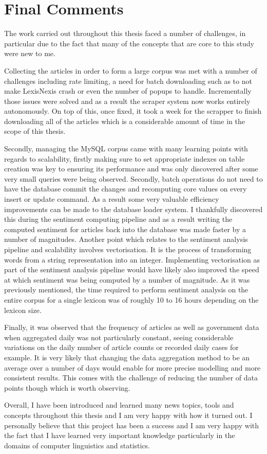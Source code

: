 \section{Final Comments}

The work carried out throughout this thesis faced a number of challenges, in particular due to the fact that many of the concepts that are core to this study were new to me.

Collecting the articles in order to form a large corpus was met with a number of challenges including rate limiting, a need for batch downloading such as to not make LexisNexis crash or even the number of popups to handle. Incrementally those issues were solved and as a result the scraper system now works entirely autonomously. On top of this, once fixed, it took a week for the scrapper to finish downloading all of the articles which is a considerable amount of time in the scope of this thesis.

Secondly, managing the MySQL corpus came with many learning points with regards to scalability, firstly making sure to set appropriate indexes on table creation was key to ensuring its performance and was only discovered after some very small queries were being observed. Secondly, batch operations do not need to have the database commit the changes and recomputing core values on every insert or update command. As a result some very valuable efficiency improvements can be made to the database loader system. I thankfully discovered this during the sentiment computing pipeline and as a result writing the computed sentiment for articles back into the database was made faster by a number of magnitudes. Another point which relates to the sentiment analysis pipeline and scalability involves vectorisation. It is the process of transforming words from a string representation into an integer. Implementing vectorisation as part of the sentiment analysis pipeline would have likely also improved the speed at which sentiment was being computed by a number of magnitude. As it was previously mentioned, the time required to perform sentiment analysis on the entire corpus for a single lexicon was of roughly 10 to 16 hours depending on the lexicon size.

Finally, it was observed that the frequency of articles as well as government data when aggregated daily was not particularly constant, seeing considerable variations on the daily number of article counts or recorded daily cases for example. It is very likely that changing the data aggregation method to be an average over a number of days would enable for more precise modelling and more consistent results. This comes with the challenge of reducing the number of data points though which is worth observing.

Overall, I have been introduced and learned many news topics, tools and concepts throughout this thesis and I am very happy with how it turned out. I personally believe that this project has been a success and I am very happy with the fact that I have learned very important knowledge particularly in the domains of computer linguistics and statistics.
